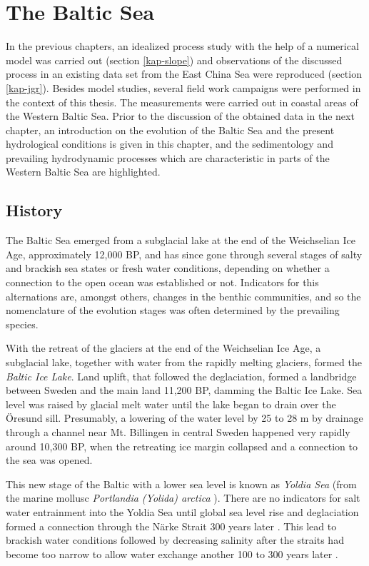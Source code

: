 \chapter{The Baltic Sea}
\label{kap-einleitung}

In the previous chapters, an idealized process study with the help of a 
numerical model was carried out (section \ref{kap-slope}) and observations of 
the discussed process in an existing data set from the East China Sea were 
reproduced (section \ref{kap-jgr}). Besides model studies, several field work 
campaigns were performed in the context of this thesis. The measurements were 
carried out in coastal areas of the Western Baltic Sea. Prior to the discussion 
of the obtained data in the next chapter, an introduction on the evolution of 
the Baltic Sea and the present hydrological conditions is given in this 
chapter, and the sedimentology and prevailing hydrodynamic processes which are 
characteristic in parts of the Western Baltic Sea are highlighted.

\section{History}

The Baltic Sea emerged from a subglacial lake at the end of the Weichselian Ice 
Age, approximately 12,000 BP, and has since gone through several stages of 
salty and brackish sea states or fresh water conditions, depending on whether a 
connection to the open ocean was established or not. Indicators for this 
alternations are, amongst others, changes in the benthic communities, and so the 
nomenclature of the evolution stages was often determined by the prevailing 
species.

With the retreat of the glaciers at the end of the Weichselian Ice Age, a 
subglacial lake, together with water from the rapidly melting glaciers, formed 
the \textit{Baltic Ice Lake}. Land uplift, that followed the deglaciation, 
formed a landbridge between Sweden and the main land 11,200 BP, damming the 
Baltic Ice Lake. Sea level was raised by glacial melt water until the lake began 
to drain over the Öresund sill. Presumably, a lowering of the water level by 25 
to 28 m by drainage through a channel near Mt. Billingen in central Sweden 
happened very rapidly around 10,300 BP, when the retreating ice margin collapsed 
\citep[][]{bjoerk95,tikkanen2002} and a connection to the sea was opened. 

This new stage of the Baltic with a lower sea level is known as \textit{Yoldia 
Sea} (from the marine mollusc \textit{Portlandia (Yolida) arctica} 
\citep[][]{schoning2001}). There are no indicators for salt water entrainment 
into the Yoldia Sea until global sea level rise and deglaciation formed a 
connection through the Närke Strait 300 years later \citep[][]{schoning2001}. 
This lead to brackish water conditions followed by decreasing salinity after the 
straits had become too narrow to allow water exchange another 100 to 300 years 
later \citep[][]{bjoerk95}.

